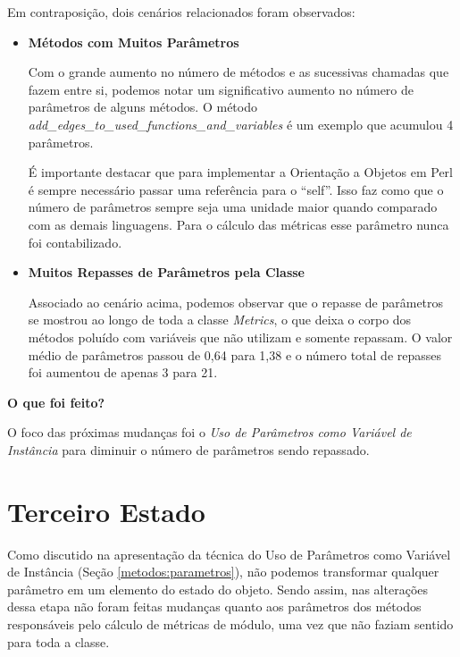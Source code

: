 

Em contraposição, dois cenários relacionados foram observados:

\begin{itemize}
\item
\textbf{Métodos com Muitos Parâmetros}

Com o grande aumento no número de métodos e as sucessivas chamadas que fazem entre si,
podemos notar um significativo aumento no número de parâmetros de alguns métodos.
O método \textit{add\_edges\_to\_used\_functions\_and\_variables} é um exemplo que acumulou
4 parâmetros.

É importante destacar que para implementar a Orientação a Objetos em Perl é sempre necessário
passar uma referência para o ``self''. Isso faz como que o número de parâmetros sempre
seja uma unidade maior quando comparado com as demais linguagens. Para o cálculo das métricas
esse parâmetro nunca foi contabilizado.



\item
\textbf{Muitos Repasses de Parâmetros pela Classe}

Associado ao cenário acima, podemos observar que o repasse de parâmetros se mostrou
ao longo de toda a classe \textit{Metrics}, o que deixa o corpo dos métodos poluído
com variáveis que não utilizam e somente repassam. O valor médio de parâmetros
passou de 0,64 para 1,38 e o número total de repasses foi aumentou de apenas 3 para 21.


\end{itemize}

\vskip 1.0cm
\textbf{O que foi feito?}

O foco das próximas mudanças foi o \textit{Uso de Parâmetros como Variável de Instância} para diminuir
o número de parâmetros sendo repassado.

\section{Terceiro Estado}

Como discutido na apresentação da técnica do Uso de Parâmetros como Variável de
Instância (Seção \ref{metodos:parametros}), não podemos transformar qualquer parâmetro em 
um elemento do estado do objeto. Sendo assim, nas alterações dessa etapa não foram feitas
mudanças quanto aos parâmetros dos métodos responsáveis pelo cálculo de métricas
de módulo, uma vez que não faziam sentido para toda a classe.

